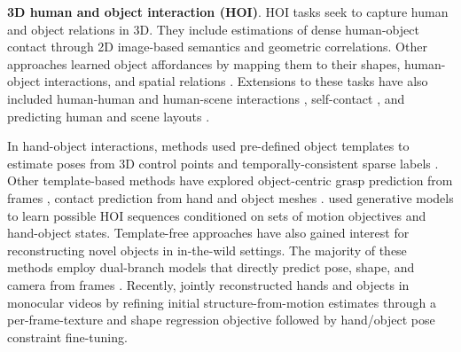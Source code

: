 \noindent
\textbf{3D human and object interaction (HOI)}. HOI tasks seek to capture human and object relations in 3D. They include estimations of dense human-object contact  through 2D image-based semantics and geometric correlations. Other approaches learned object affordances  by mapping them to their shapes, human-object interactions, and spatial relations . Extensions to these tasks have also included human-human and human-scene interactions , self-contact , and predicting human and scene layouts . 

In hand-object interactions, methods used pre-defined object templates to estimate poses from 3D control points
 and temporally-consistent sparse labels . Other template-based methods have explored
object-centric grasp prediction from frames , contact prediction from hand and object meshes .  used generative models to learn possible HOI sequences conditioned on sets of motion objectives and hand-object states. Template-free approaches have also gained interest for reconstructing novel objects in in-the-wild settings. The majority of these methods employ dual-branch models  that directly predict pose, shape, and camera from frames . Recently,  jointly reconstructed hands and objects in monocular videos by refining initial structure-from-motion estimates through a per-frame-texture and shape regression objective followed by hand/object pose constraint fine-tuning.


